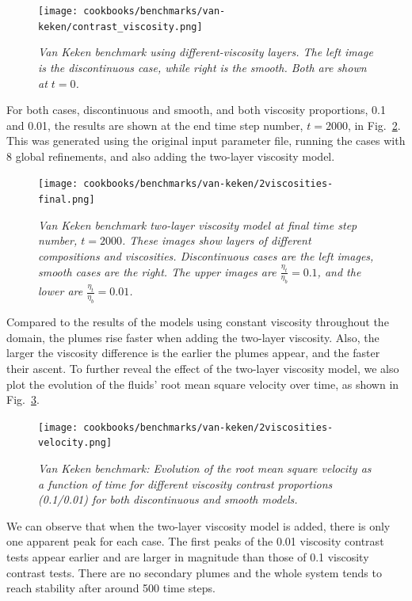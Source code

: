 \documentclass{article}
\begin{document}
\begin{figure}
        \centering
        \texttt{[image: cookbooks/benchmarks/van-keken/contrast\_viscosity.png]}
        \caption{\it Van Keken benchmark using different-viscosity layers. The left image is the discontinuous case, while right is the smooth.  Both are shown at $t=0$.}
        \label{fig:vk-7}
\end{figure}

For both cases, discontinuous and smooth, and both viscosity proportions, 0.1 and 0.01, the results are shown at the end time step number, $t=2000$, in Fig.~\ref{fig:vk-8}.  This was generated using the original input parameter file, running the cases with 8 global refinements, and also adding the two-layer viscosity model.

\begin{figure}
        \centering
        \texttt{[image: cookbooks/benchmarks/van-keken/2viscosities-final.png]}
        \caption{\it Van Keken benchmark two-layer viscosity model at final time step number, $t=2000$. These images show layers of different compositions and viscosities. Discontinuous cases are the left images, smooth cases are the right. The upper images are $\frac{\eta_{t}}{\eta_{b}}=0.1$, and the lower are $\frac{\eta_{t}}{\eta_{b}}=0.01$.}
        \label{fig:vk-8}
\end{figure}

Compared to the results of the models using constant viscosity throughout the domain, the plumes rise faster when adding the two-layer viscosity. Also, the larger the viscosity difference is the earlier the plumes appear, and the faster their ascent. To further reveal the effect of the two-layer viscosity model, we also plot the evolution of the fluids' root mean square velocity over time, as shown in Fig.~\ref{fig:vk-9}.

\begin{figure}
        \centering
        \texttt{[image: cookbooks/benchmarks/van-keken/2viscosities-velocity.png]}
        \caption{\it Van Keken benchmark: Evolution of the root mean square velocity as a function of time for different viscosity contrast proportions (0.1/0.01) for both discontinuous and smooth models.}
        \label{fig:vk-9}
\end{figure}

We can observe that when the two-layer viscosity model is added, there is only one apparent peak for each case. The first peaks of the 0.01 viscosity contrast tests appear earlier and are larger in magnitude than those of 0.1 viscosity contrast tests.  There are no secondary plumes and the whole system tends to reach stability after around 500 time steps.
\end{document}

